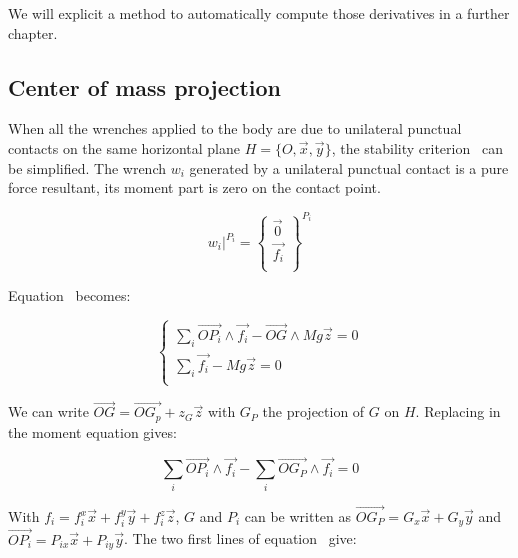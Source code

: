 We will explicit a method to automatically compute those derivatives in a further chapter.



\subsection{Center of mass projection}
\label{sub:center_of_mass_projection}


When all the wrenches applied to the body are due to unilateral punctual contacts on the same horizontal plane $H = \{O, \vec{x}, \vec{y}\}$, the stability criterion~ can be simplified.
The wrench $w_i$ generated by a unilateral punctual contact is a pure force resultant, its moment part is zero on the contact point.

\begin{equation*}
    \left. w_i \right|^{P_i} =
    \left\{
      \begin{array}{r}
      \vec{0}\\
      \vec{f_i}\\
  \end{array} \right\}^{P_i}
\end{equation*}

Equation~ becomes:

\begin{equation}
\left\{
\begin{array}{r}
  \sum\limits_i \overrightarrow{OP_i}\wedge \vec{f_i} - \overrightarrow{OG} \wedge Mg\vec{z} = 0 \\
  \sum\limits_i \vec{f_i} - Mg\vec{z} = 0 \\
\end{array}
\right.
\end{equation}

We can write $\overrightarrow{OG} = \overrightarrow{OG_p} + z_G\vec{z}$ with $G_P$ the projection of $G$ on $H$. Replacing in the moment equation gives:

\begin{equation}
  \sum\limits_i \overrightarrow{OP_i}\wedge \vec{f_i} - \sum\limits_i\overrightarrow{OG_P} \wedge \vec{f_i} = 0
\label{eq:projCoM}
\end{equation}

With $f_i = f_i^x\vec{x} + f_i^y\vec{y} + f_i^z\vec{z}$, $G$ and $P_i$ can be written as $\overrightarrow{OG_P} = G_x \vec{x} + G_y\vec{y}$ and $\overrightarrow{OP_i} = P_{ix} \vec{x} + P_{iy} \vec{y}$. The two first lines of equation~ give:

